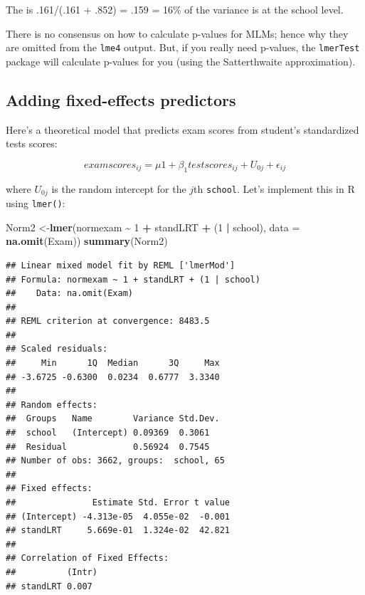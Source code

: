 \documentclass[
]{book}
\newenvironment{Shaded}{\begin{snugshade}}{\end{snugshade}}
\newcommand{\DataTypeTok}[1]{\textcolor[rgb]{0.13,0.29,0.53}{#1}}
\newcommand{\DecValTok}[1]{\textcolor[rgb]{0.00,0.00,0.81}{#1}}
\newcommand{\KeywordTok}[1]{\textcolor[rgb]{0.13,0.29,0.53}{\textbf{#1}}}
\newcommand{\NormalTok}[1]{#1}
\newcommand{\OperatorTok}[1]{\textcolor[rgb]{0.81,0.36,0.00}{\textbf{#1}}}
\newcommand{\StringTok}[1]{\textcolor[rgb]{0.31,0.60,0.02}{#1}}
\begin{document}
The is .161/(.161 + .852) = .159 = 16\% of the variance is at the school level.

There is no consensus on how to calculate p-values for MLMs; hence why they are omitted from the \texttt{lme4} output.
But, if you really need p-values, the \texttt{lmerTest} package will calculate p-values for you (using the Satterthwaite
approximation).

\hypertarget{adding-fixed-effects-predictors}{%
\subsection{Adding fixed-effects predictors}\label{adding-fixed-effects-predictors}}

Here's a theoretical model that predicts exam scores from student's standardized tests scores:

\begin{alert}

\[
examscores_{ij} = \mu1 + \beta_1testscores_{ij} + U_{0j} + \epsilon_{ij}
\]

\end{alert}

where \(U_{0j}\) is the random intercept for the \(j\)th \texttt{school}. Let's implement this in R using \texttt{lmer()}:

\begin{Shaded}
\begin{Highlighting}[]
\NormalTok{  Norm2 \textless{}{-}}\KeywordTok{lmer}\NormalTok{(normexam }\OperatorTok{\textasciitilde{}}\StringTok{ }\DecValTok{1} \OperatorTok{+}\StringTok{ }\NormalTok{standLRT }\OperatorTok{+}\StringTok{ }\NormalTok{(}\DecValTok{1} \OperatorTok{|}\StringTok{ }\NormalTok{school),}
               \DataTypeTok{data =} \KeywordTok{na.omit}\NormalTok{(Exam)) }
  \KeywordTok{summary}\NormalTok{(Norm2) }
\end{Highlighting}
\end{Shaded}

\begin{verbatim}
## Linear mixed model fit by REML ['lmerMod']
## Formula: normexam ~ 1 + standLRT + (1 | school)
##    Data: na.omit(Exam)
## 
## REML criterion at convergence: 8483.5
## 
## Scaled residuals: 
##     Min      1Q  Median      3Q     Max 
## -3.6725 -0.6300  0.0234  0.6777  3.3340 
## 
## Random effects:
##  Groups   Name        Variance Std.Dev.
##  school   (Intercept) 0.09369  0.3061  
##  Residual             0.56924  0.7545  
## Number of obs: 3662, groups:  school, 65
## 
## Fixed effects:
##               Estimate Std. Error t value
## (Intercept) -4.313e-05  4.055e-02  -0.001
## standLRT     5.669e-01  1.324e-02  42.821
## 
## Correlation of Fixed Effects:
##          (Intr)
## standLRT 0.007
\end{verbatim}
\end{document}
